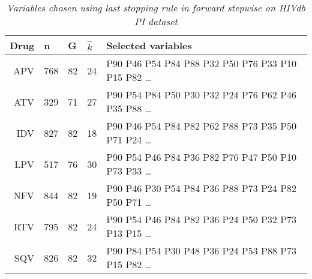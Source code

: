 \begin{table}[ht]
\centering
\begin{tabular}{rllll}
  \hline
 Drug & n & G & $\hat k$ & Selected variables \\ 
  \hline
 APV & 768 & 82 & 24 & P90 P46 P54 P84 P88 P32 P50 P76 P33 P10 P15 P82
\ldots \\ %
 ATV & 329 & 71 & 27 & P90 P54 P84 P50 P30 P32 P24 P76 P62 P46 P35 P88
 \ldots \\ %
 IDV & 827 & 82 & 18 & P90 P46 P54 P84 P82 P62 P88 P73 P35 P50 P71 P24
 \ldots \\ %
 LPV & 517 & 76 & 30 & P90 P54 P46 P84 P36 P82 P76 P47 P50 P10 P73 P33
 \ldots \\ %
 NFV & 844 & 82 & 19  & P90 P46 P30 P54 P84 P36 P88 P73 P24 P82 P50
 P71
 \ldots \\ %
 RTV & 795 & 82 & 24  & P90 P54 P46 P84 P82 P36 P24 P50 P32 P73 P13 P15
  \ldots \\ %
 SQV & 826 & 82 & 32 & P90 P84 P54 P30 P48 P36 P24 P53 P88 P73 P15 P82
 \ldots \\ %
   \hline
\end{tabular}
\caption{\em Variables chosen using \textit{last} stopping rule in forward
  stepwise on HIVdb PI dataset} 
\label{tab:hivPI}
\end{table}

